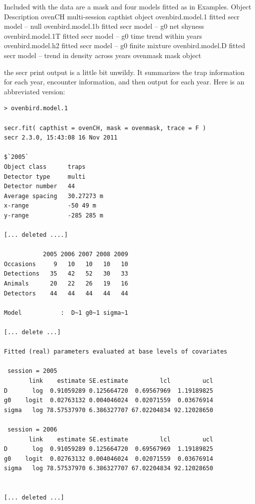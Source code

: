 Included with the data are a mask and four models fitted as in Examples.
Object  Description
ovenCH  multi-session capthist object
ovenbird.model.1  fitted secr model -- null
ovenbird.model.1b  fitted secr model -- g0 net shyness
ovenbird.model.1T  fitted secr model -- g0 time trend within years
ovenbird.model.h2  fitted secr model -- g0 finite mixture
ovenbird.model.D  fitted secr model -- trend in density across years
ovenmask  mask object


the secr print output is a little bit unwildy. It summarizes the trap
information for each year, encounter information, and then output for
each year. Here is an abbreviated version:

\begin{verbatim}
> ovenbird.model.1

secr.fit( capthist = ovenCH, mask = ovenmask, trace = F )
secr 2.3.0, 15:43:08 16 Nov 2011

$`2005`
Object class      traps 
Detector type     multi 
Detector number   44 
Average spacing   30.27273 m 
x-range           -50 49 m 
y-range           -285 285 m 

[... deleted ....]

           2005 2006 2007 2008 2009
Occasions     9   10   10   10   10
Detections   35   42   52   30   33
Animals      20   22   26   19   16
Detectors    44   44   44   44   44

Model           :  D~1 g0~1 sigma~1 

[... delete ...]

Fitted (real) parameters evaluated at base levels of covariates 

 session = 2005 
       link    estimate SE.estimate         lcl         ucl
D       log  0.91059289 0.125664720  0.69567969  1.19189825
g0    logit  0.02763132 0.004046024  0.02071559  0.03676914
sigma   log 78.57537970 6.386327707 67.02204834 92.12028650

 session = 2006 
       link    estimate SE.estimate         lcl         ucl
D       log  0.91059289 0.125664720  0.69567969  1.19189825
g0    logit  0.02763132 0.004046024  0.02071559  0.03676914
sigma   log 78.57537970 6.386327707 67.02204834 92.12028650


[... deleted ...]
\end{verbatim}



